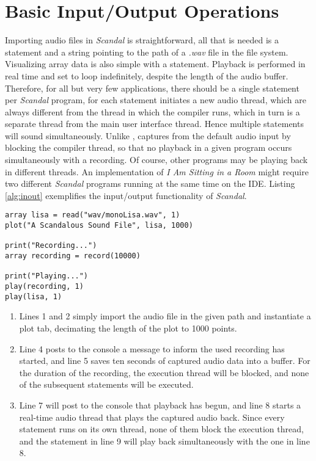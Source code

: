 \section{Basic Input/Output Operations}

Importing audio files in \emph{Scandal} is straightforward, all that is needed is a  statement and a string pointing to the path of a \emph{.wav} file in the file system. Visualizing array data is also simple with a  statement. Playback is performed in real time and set to loop indefinitely, despite the length of the audio buffer. Therefore, for all but very few applications, there should be a single  statement per \emph{Scandal} program, for each  statement initiates a new audio thread, which are always different from the thread in which the compiler runs, which in turn is a separate thread from the main user interface thread. Hence multiple  statements will sound simultaneously. Unlike ,  captures from the default audio input by blocking the compiler thread, so that no playback in a given program occurs simultaneously with a recording. Of course, other programs may be playing back in different threads. An implementation of \emph{I Am Sitting in a Room} might require two different \emph{Scandal} programs running at the same time on the IDE. Listing \ref{alg:inout} exemplifies the input/output functionality of \emph{Scandal}.

\begin{lstlisting}[emph={array,read,string,plot,print,record,play,import},emphstyle={\textbf},caption={Inputting and outputting in \emph{Scandal}},label={alg:inout}]
array lisa = read("wav/monoLisa.wav", 1)
plot("A Scandalous Sound File", lisa, 1000)

print("Recording...")
array recording = record(10000)

print("Playing...")
play(recording, 1)
play(lisa, 1)
\end{lstlisting}

\begin{enumerate}
	\item Lines 1 and 2 simply import the audio file in the given path and instantiate a plot tab, decimating the length of the plot to 1000 points.
	\addtocounter{enumi}{2}
	\item Line 4 posts to the console a message to inform the used recording has started, and line 5 saves ten seconds of captured audio data into a buffer. For the duration of the recording, the execution thread will be blocked, and none of the subsequent statements will be executed.
	\addtocounter{enumi}{2}
	\item Line 7 will post to the console that playback has begun, and line 8 starts a real-time audio thread that plays the captured audio back. Since every  statement runs on its own thread, none of them block the execution thread, and the statement in line 9 will play back simultaneously with the one in line 8.
\end{enumerate}

